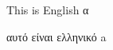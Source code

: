 \documentclass{article}
\begin{document}
This is English \foreignlanguage{greek}{α}

αυτό είναι ελληνικό \foreignlanguage{english}{a}
\end{document}
